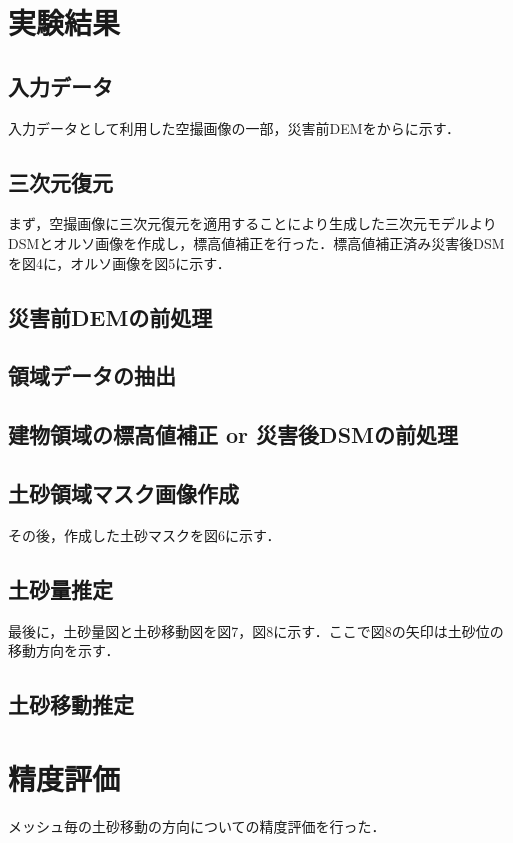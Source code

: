   \section{実験結果}
    \subsection{入力データ}
    入力データとして利用した空撮画像の一部，災害前DEMを\fref{}から\fref{}に示す．
  
    \subsection{三次元復元}
      まず，空撮画像に三次元復元を適用することにより生成した三次元モデルよりDSMとオルソ画像を作成し，標高値補正を行った．標高値補正済み災害後DSMを図4に，オルソ画像を図5に示す．

    \subsection{災害前DEMの前処理}


    \subsection{領域データの抽出}
    
    
    \subsection{建物領域の標高値補正 or 災害後DSMの前処理}
    
    
    \subsection{土砂領域マスク画像作成}
      その後，作成した土砂マスクを図6に示す．

    \subsection{土砂量推定}
      最後に，土砂量図と土砂移動図を図7，図8に示す．ここで図8の矢印は土砂位の移動方向を示す．

    \subsection{土砂移動推定}


  \section{精度評価}
    メッシュ毎の土砂移動の方向についての精度評価を行った．


